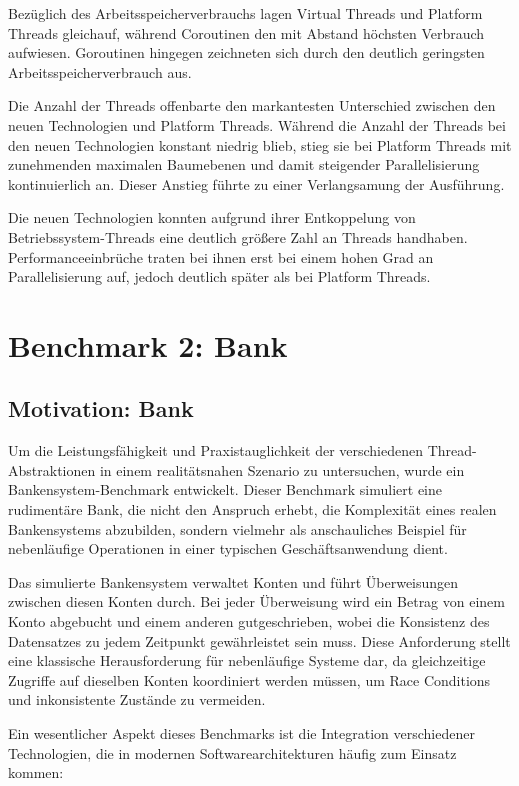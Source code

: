\documentclass[fontsize=12pt,paper=a4,twoside=semi,parskip=half-,headsepline,headinclude]{scrreprt}
\begin{document}
Bezüglich des Arbeitsspeicherverbrauchs lagen Virtual Threads und Platform Threads gleichauf, während Coroutinen den mit Abstand höchsten Verbrauch aufwiesen. Goroutinen hingegen zeichneten sich durch den deutlich geringsten Arbeitsspeicherverbrauch aus.

Die Anzahl der Threads offenbarte den markantesten Unterschied zwischen den neuen Technologien und Platform Threads. Während die Anzahl der Threads bei den neuen Technologien konstant niedrig blieb, stieg sie bei Platform Threads mit zunehmenden maximalen Baumebenen und damit steigender Parallelisierung kontinuierlich an. Dieser Anstieg führte zu einer Verlangsamung der Ausführung.

Die neuen Technologien konnten aufgrund ihrer Entkoppelung von Betriebssystem-Threads eine deutlich größere Zahl an Threads handhaben. Performanceeinbrüche traten bei ihnen erst bei einem  hohen Grad an Parallelisierung auf, jedoch deutlich später als bei Platform Threads.


\section{Benchmark 2: Bank}

\subsection{Motivation: Bank}

Um die Leistungsfähigkeit und Praxistauglichkeit der verschiedenen Thread-Abs\-trak\-tio\-nen in einem realitätsnahen Szenario zu untersuchen, wurde ein Bankensystem-Bench\-mark entwickelt. Dieser Benchmark simuliert eine rudimentäre Bank, die nicht den Anspruch erhebt, die Komplexität eines realen Bankensystems abzubilden, sondern vielmehr als anschauliches Beispiel für nebenläufige Operationen in einer typischen Ge\-schäfts\-an\-wen\-dung dient.

Das simulierte Bankensystem verwaltet Konten und führt Überweisungen zwischen diesen Konten durch. Bei jeder Überweisung wird ein Betrag von einem Konto abgebucht und einem anderen gutgeschrieben, wobei die Konsistenz des Datensatzes zu jedem Zeitpunkt gewährleistet sein muss. Diese Anforderung stellt eine klassische Herausforderung für nebenläufige Systeme dar, da gleichzeitige Zugriffe auf dieselben Konten koordiniert werden müssen, um Race Conditions und inkonsistente Zustände zu vermeiden.

Ein wesentlicher Aspekt dieses Benchmarks ist die Integration verschiedener Technologien, die in modernen Softwarearchitekturen häufig zum Einsatz kommen:
\end{document}
